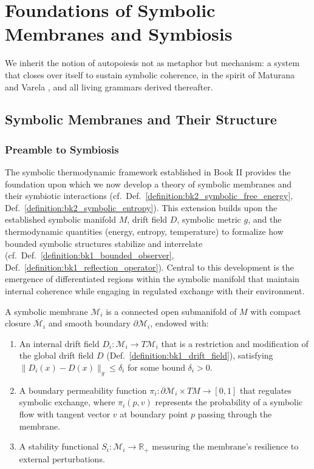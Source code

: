 \section{Foundations of Symbolic Membranes and Symbiosis} \label{sec:bk3_foundations_symbolic_membranes_symbiosis}
We inherit the notion of autopoiesis not as metaphor but mechanism: a system that closes over itself to sustain symbolic coherence, in the spirit of Maturana and Varela \cite{maturana1980autopoiesis}, and all living grammars derived thereafter.

\subsection{Symbolic Membranes and Their Structure} \label{subsec:bk3_symbolic_membranes_structure}
\subsubsection*{Preamble to Symbiosis}
\label{subsec:bk3_preamble_to_symbiosis}
The symbolic thermodynamic framework established in Book II provides the foundation upon which we now develop a theory of symbolic membranes and their symbiotic interactions (cf.~Def.~\ref{definition:bk2_symbolic_free_energy}, Def.~\ref{definition:bk2_symbolic_entropy}). This extension builds upon the established symbolic manifold $M$, drift field $D$, symbolic metric $g$, and the thermodynamic quantities (energy, entropy, temperature) to formalize how bounded symbolic structures stabilize and interrelate (cf.~Def.~\ref{definition:bk1_bounded_observer}, Def.~\ref{definition:bk1_reflection_operator}). Central to this development is the emergence of differentiated regions within the symbolic manifold that maintain internal coherence while engaging in regulated exchange with their environment.

\begin{definition} \label{definition:bk3_symbolic_membrane}
A symbolic membrane $\mathcal{M}_i$ is a connected open submanifold of $M$ with compact closure $\overline{\mathcal{M}}_i$ and smooth boundary $\partial\mathcal{M}_i$, endowed with:
\begin{enumerate}
    \item An internal drift field $D_i: \mathcal{M}_i \rightarrow T\mathcal{M}_i$ that is a restriction and modification of the global drift field $D$ (Def.~\ref{definition:bk1_drift_field}), satisfying $\|D_i(x) - D(x)\|_g \leq \delta_i$ for some bound $\delta_i > 0$.
    \item A boundary permeability function $\pi_i: \partial\mathcal{M}_i \times TM \rightarrow [0,1]$ that regulates symbolic exchange, where $\pi_i(p,v)$ represents the probability of a symbolic flow with tangent vector $v$ at boundary point $p$ passing through the membrane.
    \item A stability functional $S_i: \mathcal{M}_i \rightarrow \mathbb{R}_+$ measuring the membrane's resilience to external perturbations.
\end{enumerate}
\end{definition}


